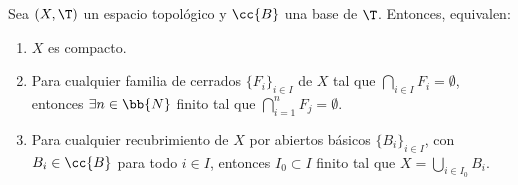 \begin{prop}
    Sea $(X,\T)$ un espacio topológico y $\cc{B}$ una base de $\T$. Entonces, equivalen:
    \begin{enumerate}
        \item $X$ es compacto.
        \item Para cualquier familia de cerrados $\{F_i\}_{i\in I}$ de $X$ tal que $\bigcap\limits_{i\in I}F_i=\emptyset$,
        entonces $\exists n\in \bb{N}$ finito tal que $\bigcap\limits_{i=1}^n F_j=\emptyset$.
        \item Para cualquier recubrimiento de $X$ por abiertos básicos $\{B_i\}_{i\in I}$, con $B_i\in \cc{B}$ para todo $i\in I$,
        entonces $I_0\subset I$ finito tal que $X=\bigcup\limits_{i\in I_0} B_i$.
    \end{enumerate}
\end{prop}
